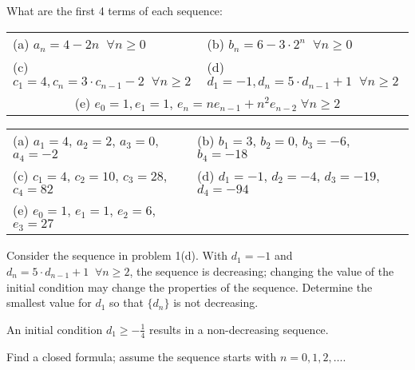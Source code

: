 \begin{questions}


 What are the first 4 terms of each sequence:

\begin{tabular}{ll}
    (a) $a_n = 4-2n\;\;\forall n \geq 0$ \hspace{0.35in} 
        & (b) $b_n = 6- 3\cdot 2^n \;\;\forall n \geq 0$ \\
    (c) $c_1 = 4,  c_n = 3\cdot c_{n-1} - 2 \;\; \forall n \geq 2$ \hspace{0.3in}
        & (d) $d_1 = -1, d_n = 5\cdot d_{n-1} + 1\;\; \forall n \geq 2$ \\
    \multicolumn{2}{c}{(e) $e_0 = 1, e_1 = 1$, $e_n = ne_{n-1} + n^2e_{n-2} \;\forall n \geq 2$}
\end{tabular}
    \ifprintanswers
        \vspace{-10pt}
   \fi
\begin{solution}

    \begin{tabular}{ll}
        (a) $a_1 = 4$, $a_2 = 2$, $a_3 = 0$, $a_4 = -2$ \hspace{0.2in}
            & (b) $b_1 = 3$, $b_2 = 0$, $b_3 = -6$, $b_4 = -18$ \\
        (c) $c_1 = 4$, $c_2 = 10$, $c_3 = 28$, $c_4 = 82$
            & (d) $d_1 = -1$, $d_2 = -4$, $d_3 = -19$, $d_4 = -94$ \\
        (e) $e_0 = 1$, $e_1 = 1$, $e_2 = 6$, $e_3 = 27$
    \end{tabular}
\end{solution}


\bonusquestion[3] Consider the sequence in problem 1(d).  With $d_1 = -1$ and $d_n = 5\cdot d_{n-1} + 1 \;\;\forall n \geq 2$, the sequence is decreasing; changing the value of the initial condition may change the properties of the sequence.  Determine the smallest value for $d_1$ so that $\{d_n\}$ is not decreasing.
\ifprintanswers
        \vspace{-10pt}
   \fi
\begin{solution}
 An initial condition $d_1 \geq -\frac{1}{4}$ results in a non-decreasing sequence.
\end{solution}



 Find a closed formula; assume the sequence starts with $n=0, 1, 2, \ldots$.


\end{questions}
